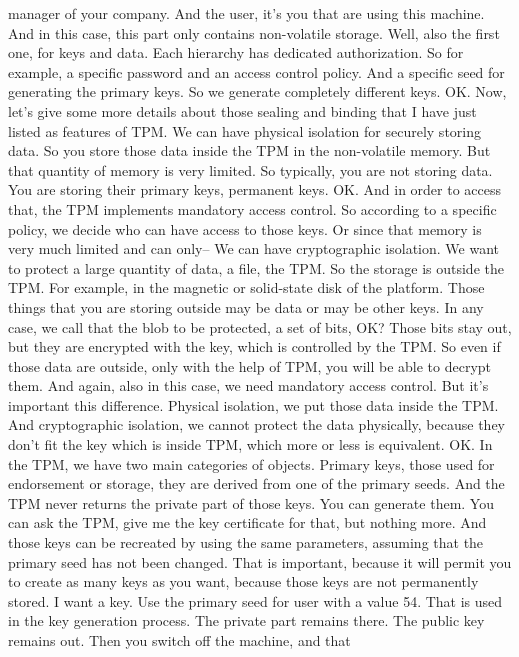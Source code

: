  manager of your company. And the user, it's you that are using this machine.
 And in this case, this part only contains non-volatile storage. Well, also the
 first one, for keys and data. Each hierarchy has dedicated authorization. So
 for example, a specific password and an access control policy. And a specific
 seed for generating the primary keys. So we generate completely different
 keys. OK. Now, let's give some more details about those sealing and binding
 that I have just listed as features of TPM. We can have physical isolation for
 securely storing data. So you store those data inside the TPM in the
 non-volatile memory. But that quantity of memory is very limited. So
 typically, you are not storing data. You are storing their primary keys,
 permanent keys. OK. And in order to access that, the TPM implements mandatory
 access control. So according to a specific policy, we decide who can have
 access to those keys. Or since that memory is very much limited and can only--
 We can have cryptographic isolation. We want to protect a large quantity of
 data, a file, the TPM. So the storage is outside the TPM. For example, in the
 magnetic or solid-state disk of the platform. Those things that you are
 storing outside may be data or may be other keys. In any case, we call that
 the blob to be protected, a set of bits, OK? Those bits stay out, but they are
 encrypted with the key, which is controlled by the TPM. So even if those data
 are outside, only with the help of TPM, you will be able to decrypt them. And
 again, also in this case, we need mandatory access control. But it's important
 this difference. Physical isolation, we put those data inside the TPM. And
 cryptographic isolation, we cannot protect the data physically, because they
 don't fit the key which is inside TPM, which more or less is equivalent. OK.
 In the TPM, we have two main categories of objects. Primary keys, those used
 for endorsement or storage, they are derived from one of the primary seeds.
 And the TPM never returns the private part of those keys. You can generate
 them. You can ask the TPM, give me the key certificate for that, but nothing
 more. And those keys can be recreated by using the same parameters, assuming
 that the primary seed has not been changed. That is important, because it will
 permit you to create as many keys as you want, because those keys are not
 permanently stored. I want a key. Use the primary seed for user with a value
 54. That is used in the key generation process. The private part remains
 there. The public key remains out. Then you switch off the machine, and that
